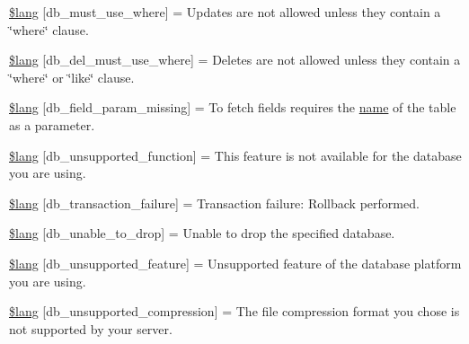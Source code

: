 \begin{DoxyCompactItemize}
\item 
\mbox{\hyperlink{db__lang_8php_a2a744fb7156ec6fa5e103c1af04b4db2}{\$lang}} \mbox{[}\textquotesingle{}db\+\_\+must\+\_\+use\+\_\+where\textquotesingle{}\mbox{]} = \textquotesingle{}Updates are not allowed unless they contain a \char`\"{}where\char`\"{} clause.\textquotesingle{}
\item 
\mbox{\hyperlink{db__lang_8php_a9dae040ef4bd563b5ed5df288c98d356}{\$lang}} \mbox{[}\textquotesingle{}db\+\_\+del\+\_\+must\+\_\+use\+\_\+where\textquotesingle{}\mbox{]} = \textquotesingle{}Deletes are not allowed unless they contain a \char`\"{}where\char`\"{} or \char`\"{}like\char`\"{} clause.\textquotesingle{}
\item 
\mbox{\hyperlink{db__lang_8php_a80033cf90bcb8c6b9db4593fd6e2c810}{\$lang}} \mbox{[}\textquotesingle{}db\+\_\+field\+\_\+param\+\_\+missing\textquotesingle{}\mbox{]} = \textquotesingle{}To fetch fields requires the \mbox{\hyperlink{waiter_2order_8php_afb270cde4944e425a37cf277116a7f43}{name}} of the table as a parameter.\textquotesingle{}
\item 
\mbox{\hyperlink{db__lang_8php_aed09746af6105cd39f2cc6ffaa96740a}{\$lang}} \mbox{[}\textquotesingle{}db\+\_\+unsupported\+\_\+function\textquotesingle{}\mbox{]} = \textquotesingle{}This feature is not available for the database you are using.\textquotesingle{}
\item 
\mbox{\hyperlink{db__lang_8php_ad6164b67b0187b403166c652a8503ace}{\$lang}} \mbox{[}\textquotesingle{}db\+\_\+transaction\+\_\+failure\textquotesingle{}\mbox{]} = \textquotesingle{}Transaction failure\+: Rollback performed.\textquotesingle{}
\item 
\mbox{\hyperlink{db__lang_8php_a1c70abccf684437ff6e0d83e1ca1b791}{\$lang}} \mbox{[}\textquotesingle{}db\+\_\+unable\+\_\+to\+\_\+drop\textquotesingle{}\mbox{]} = \textquotesingle{}Unable to drop the specified database.\textquotesingle{}
\item 
\mbox{\hyperlink{db__lang_8php_a21ca7e58bb09c70a6cb55a8c285ff3e4}{\$lang}} \mbox{[}\textquotesingle{}db\+\_\+unsupported\+\_\+feature\textquotesingle{}\mbox{]} = \textquotesingle{}Unsupported feature of the database platform you are using.\textquotesingle{}
\item 
\mbox{\hyperlink{db__lang_8php_a5537af909553ea18053324d63154b49f}{\$lang}} \mbox{[}\textquotesingle{}db\+\_\+unsupported\+\_\+compression\textquotesingle{}\mbox{]} = \textquotesingle{}The file compression format you chose is not supported by your server.\textquotesingle{}
\item 

\end{DoxyCompactItemize}

